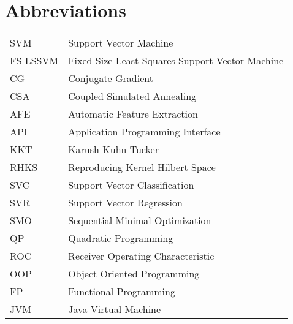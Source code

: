 \documentclass[master=mai,masteroption=ecs]{kulemt}
\begin{document}
\section*{Abbreviations}
\begin{flushleft}
  \renewcommand{\arraystretch}{1.1}
  \begin{tabularx}{\textwidth}{@{}p{12mm}X@{}}
    SVM   & Support Vector Machine \\
    FS-LSSVM   & Fixed Size Least Squares Support Vector Machine \\
    CG   & Conjugate Gradient \\
    CSA  & Coupled Simulated Annealing \\
    AFE  & Automatic Feature Extraction \\
    API  & Application Programming Interface \\ 
    KKT  & Karush Kuhn Tucker \\
    RHKS & Reproducing Kernel Hilbert Space\\
    SVC & Support Vector Classification\\
    SVR & Support Vector Regression\\
    SMO & Sequential Minimal Optimization\\
    QP & Quadratic Programming\\
    ROC & Receiver Operating Characteristic\\
    OOP & Object Oriented Programming\\
    FP & Functional Programming\\
    JVM & Java Virtual Machine\\
  \end{tabularx}
\end{flushleft}
\end{document}
